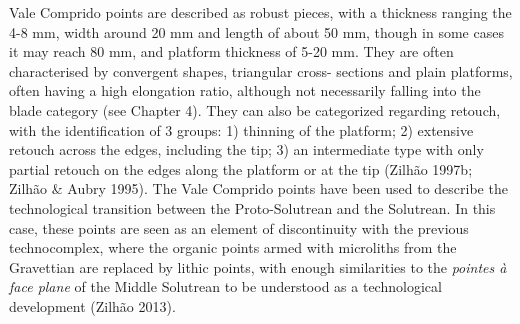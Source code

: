 \documentclass[12pt,twoside]{reedthesis}
\begin{document}
Vale Comprido points are described as robust pieces, with a thickness ranging the 4-8 mm, width around 20 mm and length of about 50 mm, though in some cases it may reach 80 mm, and platform thickness of 5-20 mm. They are often characterised by convergent shapes, triangular cross- sections and plain platforms, often having a high elongation ratio, although not necessarily falling into the blade category (see Chapter 4). They can also be categorized regarding retouch, with the identification of 3 groups: 1) thinning of the platform; 2) extensive retouch across the edges, including the tip; 3) an intermediate type with only partial retouch on the edges along the platform or at the tip (Zilhão 1997b; Zilhão \& Aubry 1995). The Vale Comprido points have been used to describe the technological transition between the Proto-Solutrean and the Solutrean. In this case, these points are seen as an element of discontinuity with the previous technocomplex, where the organic points armed with microliths from the Gravettian are replaced by lithic points, with enough similarities to the \emph{pointes à face plane} of the Middle Solutrean to be understood as a technological development (Zilhão 2013).
\end{document}
